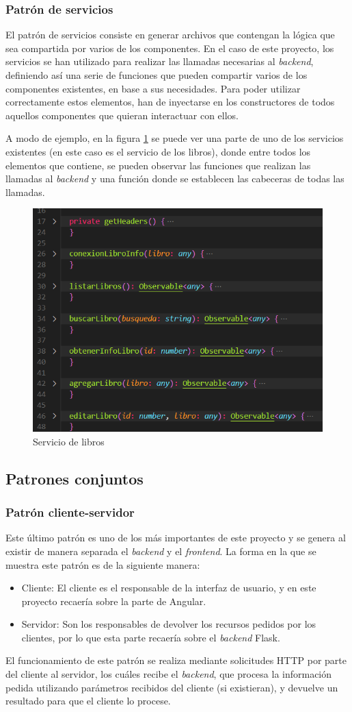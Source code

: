 \subsubsection{Patrón de servicios~\cite{PatrónServicios}}
El patrón de servicios consiste en generar archivos que contengan la lógica que sea compartida por varios de los componentes. En el caso de este proyecto, los servicios se han utilizado para realizar las llamadas necesarias al \textit{backend}, definiendo así una serie de funciones que pueden compartir varios de los componentes existentes, en base a sus necesidades.
Para poder utilizar correctamente estos elementos, han de inyectarse en los constructores de todos aquellos componentes que quieran interactuar con ellos.

A modo de ejemplo, en la figura \ref{Servicio de libros} se puede ver una parte de uno de los servicios existentes (en este caso es el servicio de los libros), donde entre todos los elementos que contiene, se pueden observar las funciones que realizan las llamadas al \textit{backend} y una función donde se establecen las cabeceras de todas las llamadas.

\begin{figure}[htbp]
    \centering
    \includegraphics[width=0.7\linewidth]{Imagenes/LibroService.png}
    \caption{Servicio de libros}
    \label{Servicio de libros}
\end{figure}
\FloatBarrier

\newpage
\subsection{Patrones conjuntos}
\subsubsection{Patrón cliente-servidor~\cite{ModeloClienteServidor}}
Este último patrón es uno de los más importantes de este proyecto y se genera al existir de manera separada el \textit{backend} y el \textit{frontend}.
La forma en la que se muestra este patrón es de la siguiente manera:
\begin{itemize}
    \item Cliente: El cliente es el responsable de la interfaz de usuario, y en este proyecto recaería sobre la parte de Angular.
    \item Servidor: Son los responsables de devolver los recursos pedidos por los clientes, por lo que esta parte recaería sobre el \textit{backend} Flask.
\end{itemize}

El funcionamiento de este patrón se realiza mediante solicitudes HTTP por parte del cliente al servidor, los cuáles recibe el \textit{backend}, que procesa la información pedida utilizando parámetros recibidos del cliente (si existieran), y devuelve un resultado para que el cliente lo procese.


